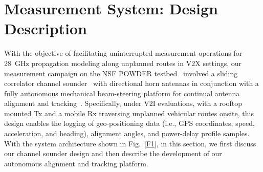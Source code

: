 \documentclass[10pt, twocolumn]{IEEEtran}
\begin{document}
\section{Measurement System: Design Description}\label{S2}
With the objective of facilitating uninterrupted measurement operations for \SI{28}{\giga\hertz} propagation modeling along unplanned routes in V$2$X settings, our measurement campaign on the NSF POWDER testbed~\cite{POWDER} involved a sliding correlator channel sounder~\cite{Purdue} with directional horn antennas in conjunction with a fully autonomous mechanical beam-steering platform for continual antenna alignment and tracking~\cite{NRSM}. Specifically, under V$2$I evaluations, with a rooftop mounted Tx and a mobile Rx traversing unplanned vehicular routes onsite, this design enables the logging of geo-positioning data (i.e., GPS coordinates, speed, acceleration, and heading), alignment angles, and power-delay profile samples. With the system architecture shown in Fig.~\ref{F1}, in this section, we first discuss our channel sounder design and then describe the development of our autonomous alignment and tracking platform.
\end{document}

